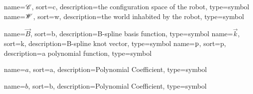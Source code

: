 	{%
		name=\ensuremath{\vecspace{C}},
		sort=c,
		description=the configuration space of the robot,
		type=symbol
	}
	\newcommand{\configurationspace}{\gls{sym:configurationspace}}
	{%
		name=\ensuremath{\vecspace{W}},
		sort=w,
		description=the world inhabited by the robot,
		type=symbol
	}
	\newcommand{\world}{\gls{sym:worldspace}}

	{%
		name=\ensuremath{\vec{B}},
		sort=b,
		description=B-spline basis function,
		type=symbol
	}
	\newcommand{\bspline}{\gls{sym:bspline}}
	{%
		name=\ensuremath{\vec{k}},
		sort=k,
		description=B-spline knot vector,
		type=symbol
	}
	\newcommand{\knot}{\gls{sym:knot}}
	{%
		name=\ensuremath{\func{p}},
		sort=p,
		description=a polynomial function,
		type=symbol
	}
	\newcommand{\polynomial}{\gls{sym:polynomial}}

	{%
		name=\ensuremath{a},
		sort=a,
		description=Polynomial Coefficient,
		type=symbol
	}
	\newcommand{\coefficient}{\gls{sym:coefficient}}

	{%
		name=\ensuremath{b},
		sort=b,
		description=Polynomial Coefficient,
		type=symbol
	}
	\newcommand{\coefficientb}{\gls{sym:coefficientb}}

